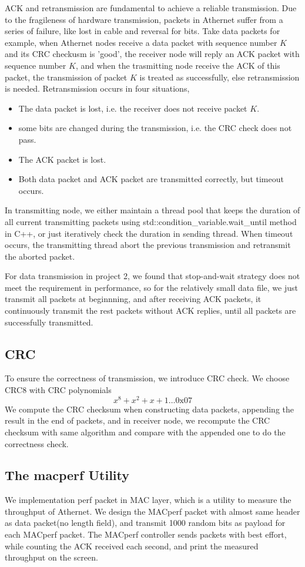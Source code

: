 \documentclass[11pt, conference]{IEEEtran}
\begin{document}
ACK and retransmission are fundamental to achieve a reliable transmission. Due to the fragileness of hardware transmission, packets in 
Athernet suffer from a series of failure, like lost in cable and reversal for bits. Take data packets for example, when Athernet nodes receive
a data packet with sequence number $K$ and its CRC checkusm is 'good', the receiver node will reply an ACK packet with sequence number $K$, and when the
trasmitting node receive the ACK of this packet, the transmission of packet $K$ is treated as successfully, else retransmission is needed. Retransmission occurs
in four situations,
\begin {itemize}
\item The data packet is lost, i.e. the receiver does not receive packet $K$.
\item some bits are changed during the transmission, i.e. the CRC check does not pass.
\item The ACK packet is lost.
\item Both data packet and ACK packet are transmitted correctly, but timeout occurs.
\end {itemize}
In transmitting node, we either maintain a thread pool that keeps the duration of all current transmitting packets using std::condition\_variable.wait\_until method
in C++, or just iteratively check the duration in sending thread. When timeout occurs, the transmitting thread abort the previous transmission and retransmit the aborted packet.

For data transmission in project 2, we found that stop-and-wait strategy does not meet the requirement in performance, so for the relatively small data file, we just transmit all
packets at beginnning, and after receiving ACK packets, it continuously transmit the rest packets without ACK replies, until all packets are successfully transmitted.

\subsection{CRC}
To ensure the correctness of transmission, we introduce CRC check. We choose CRC8 with CRC polynomials
\[
    x^8 + x^2 + x + 1 \dots 0\text{x}07
\]
We compute the CRC checksum when constructing data packets, appending the result in the end of packets, and in receiver node, we recompute the CRC checksum with same algorithm and compare with the appended one to do the correctness check.
\subsection{The \textsf{macperf} Utility}
We implementation perf packet in MAC layer, which is a utility to measure the throughput of Athernet. We design the MACperf packet with almost same header as data packet(no length field), and transmit 1000 random bits as 
payload for each MACperf packet. The MACperf controller sends packets with best effort, while counting the ACK received each second, and print the measured throughput on the screen.
\end{document}
